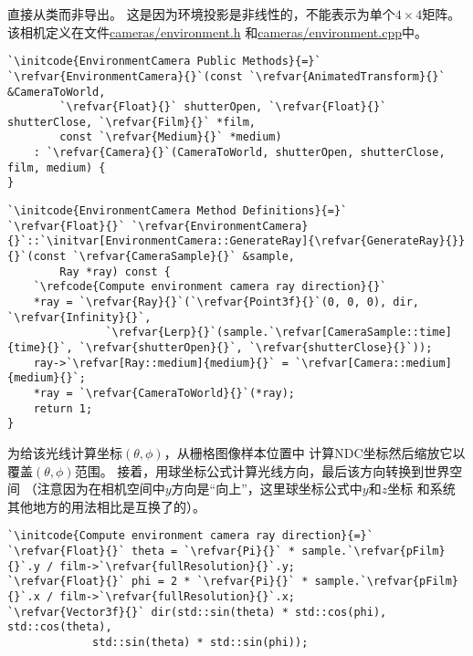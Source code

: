 直接从类而非导出。
这是因为环境投影是非线性的，不能表示为单个$4\times4$矩阵。
该相机定义在文件\href{https://github.com/mmp/pbrt-v3/tree/master/src/cameras/environment.h}{\ttfamily cameras/environment.h}
和\href{https://github.com/mmp/pbrt-v3/blob/master/src/cameras/environment.cpp}{\ttfamily cameras/environment.cpp}中。
\begin{lstlisting}
`\initcode{EnvironmentCamera Public Methods}{=}`
`\refvar{EnvironmentCamera}{}`(const `\refvar{AnimatedTransform}{}` &CameraToWorld,
        `\refvar{Float}{}` shutterOpen, `\refvar{Float}{}` shutterClose, `\refvar{Film}{}` *film,
        const `\refvar{Medium}{}` *medium)
    : `\refvar{Camera}{}`(CameraToWorld, shutterOpen, shutterClose, film, medium) {
}
\end{lstlisting}
\begin{lstlisting}
`\initcode{EnvironmentCamera Method Definitions}{=}`
`\refvar{Float}{}` `\refvar{EnvironmentCamera}{}`::`\initvar[EnvironmentCamera::GenerateRay]{\refvar{GenerateRay}{}}{}`(const `\refvar{CameraSample}{}` &sample,
        Ray *ray) const {
    `\refcode{Compute environment camera ray direction}{}`
    *ray = `\refvar{Ray}{}`(`\refvar{Point3f}{}`(0, 0, 0), dir, `\refvar{Infinity}{}`,
               `\refvar{Lerp}{}`(sample.`\refvar[CameraSample::time]{time}{}`, `\refvar{shutterOpen}{}`, `\refvar{shutterClose}{}`));
    ray->`\refvar[Ray::medium]{medium}{}` = `\refvar[Camera::medium]{medium}{}`;
    *ray = `\refvar{CameraToWorld}{}`(*ray);
    return 1;
}
\end{lstlisting}

为给该光线计算坐标$(\theta,\phi)$，从栅格图像样本位置中
计算NDC坐标然后缩放它以覆盖$(\theta,\phi)$范围。
接着，用球坐标公式计算光线方向，最后该方向转换到世界空间
（注意因为在相机空间中$y$方向是“向上”，这里球坐标公式中$y$和$z$坐标
和系统其他地方的用法相比是互换了的）。
\begin{lstlisting}
`\initcode{Compute environment camera ray direction}{=}`
`\refvar{Float}{}` theta = `\refvar{Pi}{}` * sample.`\refvar{pFilm}{}`.y / film->`\refvar{fullResolution}{}`.y;
`\refvar{Float}{}` phi = 2 * `\refvar{Pi}{}` * sample.`\refvar{pFilm}{}`.x / film->`\refvar{fullResolution}{}`.x;
`\refvar{Vector3f}{}` dir(std::sin(theta) * std::cos(phi), std::cos(theta),
             std::sin(theta) * std::sin(phi));
\end{lstlisting}